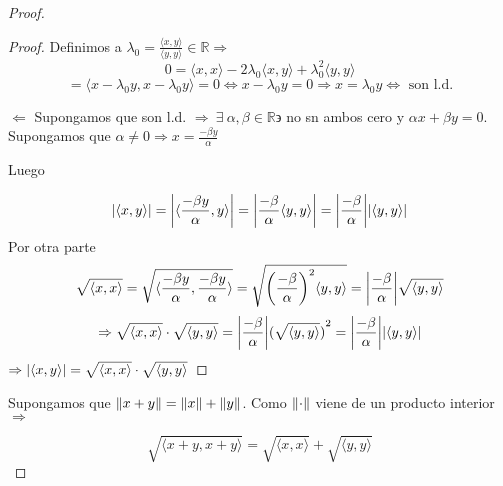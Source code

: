 \documentclass[12pt]{article}
\newcommand\R{\ensuremath{\mathbb{R}}}
\begin{document}
\begin{enumerate}[label=\textbf{\arabic*}.]
\begin{proof}
\begin{proof}
        Definimos a $\lambda_0 = \frac{\langle x,y \rangle }{\langle y,y \rangle } \in \R \Rightarrow$
        \begin{equation*}
            0 = \langle x,x \rangle - 2\lambda_0 \langle x,y \rangle + {\lambda}_{0}^{2} \langle y,y \rangle
        \end{equation*}
        \begin{equation*}
            = \langle x - {\lambda}_{0}y, x - {\lambda}_{0}y \rangle = 0 \Leftrightarrow x - {\lambda}_{0}y = 0 \Rightarrow x = {\lambda}_{0}y  \Leftrightarrow \text{ son l.d.}
        \end{equation*}

        $\Leftarrow$ Supongamos que son l.d. $\Rightarrow \: \exists \: \alpha, \beta \in \R \backepsilon$ no sn ambos cero y $\alpha x + \beta y = 0$. Supongamos que $\alpha \neq 0 \Rightarrow x = \frac{ - \beta y }{\alpha}$

        Luego

        \begin{equation*}
            \abs{\langle x,y \rangle} = \abs{\langle \frac{ - \beta y }{\alpha}, y \rangle } = \abs{\frac{ - \beta  }{\alpha} \langle y , y \rangle} = \abs{\frac{ - \beta  }{\alpha}} \abs{\langle y, y \rangle}
        \end{equation*}
        Por otra parte 
        \begin{equation*}
            \sqrt{\langle x,x \rangle} = \sqrt{\langle  \frac{ - \beta y }{\alpha},  \frac{ - \beta y }{\alpha} \rangle} = \sqrt{{\left( \frac{ - \beta }{\alpha} \right)}^{2}  \langle y , y \rangle } = \abs{\frac{ - \beta  }{\alpha}} \sqrt{\langle y, y \rangle}
        \end{equation*}
        \begin{equation*}
            \Rightarrow \sqrt{\langle x,x \rangle} \cdot \sqrt{\langle y, y \rangle} = \abs{\frac{ - \beta  }{\alpha}} {(\sqrt{\langle y, y \rangle})}^{2} = \abs{\frac{ - \beta  }{\alpha}} \abs{\langle y, y \rangle}
        \end{equation*}
        $\Rightarrow \abs{\langle x,y \rangle} = \sqrt{\langle x,x \rangle} \cdot \sqrt{\langle y,y \rangle}$
    \end{proof}

    Supongamos que $\norm{x+y} = \norm{x} + \norm{y}$. Como $\norm{\cdot}$ viene de un producto interior $\Rightarrow$

    \begin{equation*}
        \sqrt{\langle x+y, x+y \rangle} = \sqrt{\langle x,x \rangle} + \sqrt{\langle y,y \rangle}
    \end{equation*}


\end{proof}
\end{enumerate}
\end{document}
